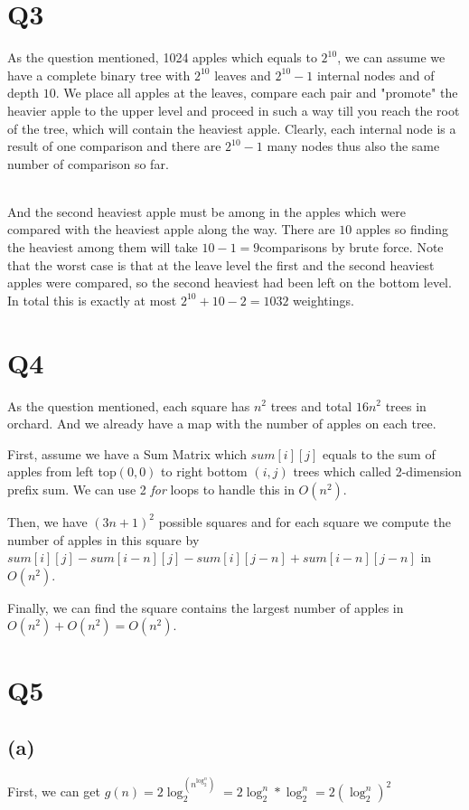 \documentclass[a4paper]{article}
\begin{document}
	
	\section*{Q3}
	As the question mentioned, 1024 apples which equals to $2^{10}$, we can assume we have a complete binary tree with $2^{10}$ leaves and $2^{10} -1$ internal nodes and of depth $10$. We place all apples at the leaves, compare each pair and "promote" the heavier apple to the upper level and proceed in such a way till you reach the root of the tree, which will contain the heaviest apple. Clearly, each internal node is a result of one comparison and there are $2^{10} -1$ many nodes thus also the same number of comparison so far. 
	
	~\\	
	 And the second heaviest apple must be among in the apples which were compared with the heaviest apple along the way. There are $10$ apples so finding the heaviest among them will take $10-1=9$comparisons by brute force. Note that the worst case is that at the leave level the first and the second heaviest apples were compared, so the second heaviest had been left on the bottom level. In total this is exactly at most $2^{10} +10-2 = 1032$ weightings.
	\section*{Q4}
	As the question mentioned, each square has $n^2$ trees and total $16n^2$ trees in orchard. And we already have a map with the number of apples on each tree.
	
	First, assume we have a Sum Matrix which $sum[i][j]$ equals to  the sum of apples from left top$(0,0)$ to right bottom $(i,j)$ trees which called 2-dimension prefix sum. We can use 2 \textit{for} loops to handle this in $O(n^2)$.
	
	Then, we have $(3n +1)^2$ possible squares and for each square we compute the number of apples in this square by $sum[i][j] - sum[i-n][j] - sum[i][j-n] + sum[i-n][j-n]$ in $O(n^2)$. 
	
	Finally, we can find the square contains the largest number of apples in $O(n^2) + O(n^2) = O(n^2)$.
	
	\section*{Q5}
	\subsection*{(a)}
	First, we can get $g(n) = 2\log_2^{(n^{\log_2^n})} = 2\log_2^n * \log_2^n = 2(\log_2^n)^2$
	
\end{document}
